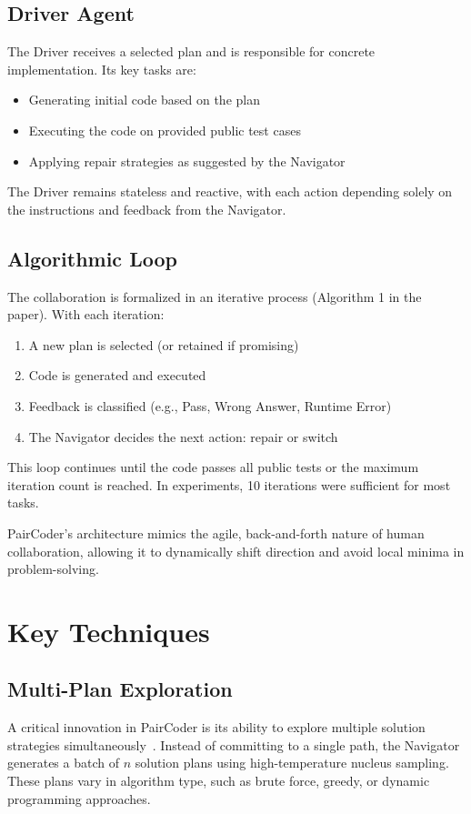 \documentclass[11pt,a4paper]{article}
\begin{document}
\subsection{Driver Agent}
The Driver receives a selected plan and is responsible for concrete implementation. Its key tasks are:
\begin{itemize}
\item Generating initial code based on the plan
\item Executing the code on provided public test cases
\item Applying repair strategies as suggested by the Navigator
\end{itemize}
The Driver remains stateless and reactive, with each action depending solely on the instructions and feedback from the Navigator.

\subsection{Algorithmic Loop}
The collaboration is formalized in an iterative process (Algorithm 1 in the paper). With each iteration:
\begin{enumerate}
\item A new plan is selected (or retained if promising)
\item Code is generated and executed
\item Feedback is classified (e.g., Pass, Wrong Answer, Runtime Error)
\item The Navigator decides the next action: repair or switch
\end{enumerate}
This loop continues until the code passes all public tests or the maximum iteration count is reached. In experiments, 10 iterations were sufficient for most tasks.

PairCoder’s architecture mimics the agile, back-and-forth nature of human collaboration, allowing it to dynamically shift direction and avoid local minima in problem-solving.

\section{Key Techniques}
\subsection{Multi-Plan Exploration}
A critical innovation in PairCoder is its ability to explore multiple solution strategies simultaneously~\cite{zhang2024paircoder}. Instead of committing to a single path, the Navigator generates a batch of $n$ solution plans using high-temperature nucleus sampling. These plans vary in algorithm type, such as brute force, greedy, or dynamic programming approaches.
\end{document}
